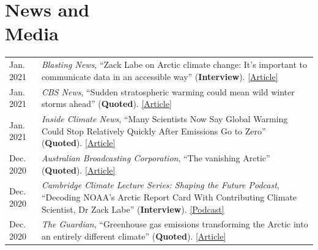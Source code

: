\documentclass[margin,line,palatino,courier,10pt]{res}
\begin{document}
\begin{resume}
\begin{tabular}{@{}p{2.2in}p{3in}}
\end{tabular}

\vspace{-0.1in}
\noindent\textcolor{Cerulean}{\makebox[\linewidth][r]{\rule{\textwidth}{5pt}}}
\vspace{-0.3in}

\section{\sc \textcolor{Cerulean}{\large{\textbf{News and\\ Media}}}}
\vspace*{0.04in}
\begin{tabular}{@{}p{0.9in}p{4in}}
Jan. 2021 & \textit{Blasting News}, ``Zack Labe on Arctic climate change: It's important to communicate data in an accessible way'' (\textbf{Interview}). \href{https://us.blastingnews.com/opinion/2021/01/zack-labe-on-arctic-climate-change-its-important-to-communicate-data-in-an-accessible-way-003267614.html}{[Article]}\\
Jan. 2021 & \textit{CBS News}, ``Sudden stratospheric warming could mean wild winter storms ahead'' (\textbf{Quoted}). \href{https://www.cbsnews.com/news/stratospheric-warming-winter-weather-coming/}{[Article]}\\
Jan. 2021 & \textit{Inside Climate News}, ``Many Scientists Now Say Global Warming Could Stop Relatively Quickly After Emissions Go to Zero'' (\textbf{Quoted}). \href{https://insideclimatenews.org/news/03012021/five-aspects-climate-change-2020/}{[Article]}\\
Dec. 2020 & \textit{Australian Broadcasting Corporation}, ``The vanishing Arctic'' (\textbf{Quoted}). \href{https://www.abc.net.au/news/2020-12-16/arctic-sea-ice-dramatic-transformation-as-seen-by-satellites/12961584?nw=0}{[Article]}\\
Dec. 2020 & \textit{Cambridge Climate Lecture Series: Shaping the Future Podcast}, ``Decoding NOAA's Arctic Report Card With Contributing Climate Scientist, Dr Zack Labe'' (\textbf{Interview}). \href{https://climateseries.com/climate-change-podcast/80-arctic-report-card-zack-labe}{[Podcast]}\\
Dec. 2020 & \textit{The Guardian}, ``Greenhouse gas emissions transforming the Arctic into an entirely different climate'' (\textbf{Quoted}). \href{https://www.theguardian.com/world/2020/dec/08/arctic-report-climate-crisis-wildfires-ice-loss}{[Article]}\\

\end{tabular}
\end{resume}
\end{document}
